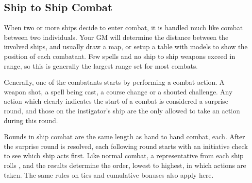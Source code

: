 \begin{multicols*}{2}
\subsection{Ship to Ship Combat}
When two or more ships decide to enter combat, it is handled much like combat between two individuals. Your GM will determine the distance between the involved ships, and usually draw a map, or setup a table with models to show the position of each combatant. Few spells and no ship to ship weapons exceed  in range, so this is generally the
largest range set for most combats.

Generally, one of the combatants starts by performing a combat action. A weapon shot, a spell being cast, a course change or a shouted challenge. Any action which clearly indicates the start of a combat is considered a surprise round, and those on the instigator's ship are the
only allowed to take an action during this round.

Rounds in ship combat are the same length as hand to hand combat,  each. After the surprise round is resolved, each following round starts with an initiative check
to see which ship acts first. Like normal combat, a representative from each ship rolls , and the results determine the order, lowest to highest, in which actions are
taken. The same rules on ties and cumulative bonuses also apply here.


\end{multicols*}
